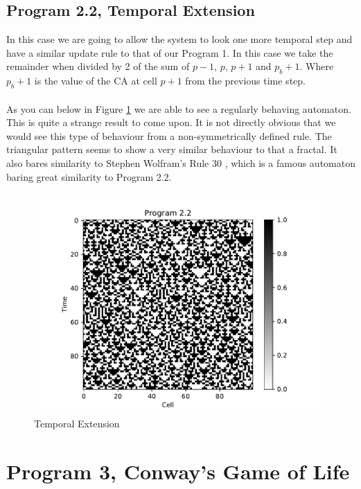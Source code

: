 \documentclass{article}
\begin{document}
\subsection{Program 2.2, Temporal Extension}
In this case we are going to allow the system to look one more temporal step and have a similar update rule to that of our Program 1. In this case we take the remainder when divided by 2 of the sum of $p-1$, $p$, $p+1$ and $p_b+1$. Where $p_b+1$ is the value of the CA at cell $p+1$ from the previous time step.\\
\\
As you can below in Figure \ref{fig:prog22} we are able to see a regularly behaving automaton. This is quite a strange result to come upon. It is not directly obvious that we would see this type of behaviour from a non-symmetrically defined rule. The triangular pattern seems to show a very similar behaviour to that a fractal. It also bares similarity to Stephen Wolfram's Rule 30 \cite{rule30}, which is a famous automaton baring great similarity to Program 2.2.
\begin{figure}[H]
\centering
\includegraphics[scale=0.6]{program22.pdf}
\caption{Temporal Extension}\label{fig:prog22}
\end{figure}

\section{Program 3, Conway's Game of Life}
\end{document}
